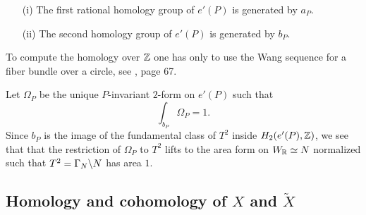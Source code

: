 \vskip 0.3in 

\begin{lemma}\label{ePhomology}

\begin{enumerate}
\item[(i)] The first rational homology group of $e'(P)$ is generated by $a_P$.
\item[(ii)] The second homology group of $e'(P)$ is generated by $b_P$.
\end{enumerate}
\end{lemma}
\begin{remark} To compute the homology over $\mathbb{Z}$ one has only to use the Wang sequence for a fiber bundle over a circle, see \cite{Milnor}, page 67.
\end{remark}

Let $\Omega_P$ be the unique $P$-invariant $2$-form on $e'(P)$ such that
\begin{equation}\label{areaform}
\int_{b_P} \Omega_P = 1.
\end{equation}
Since $b_P$ is the image of the fundamental class of $T^2$ inside $H_2(e'(P),\mathbb{Z})$, we see that that the restriction of $\Omega_P$ to $T^2$ lifts to the area form on $W_{\mathbb{R}} \simeq N$ normalized such that $T^2=\Gamma_N \backslash N$ has area $1$.


\vskip 0.3in 





\subsection{Homology and cohomology of $X$ and $\tilde{X}$}

